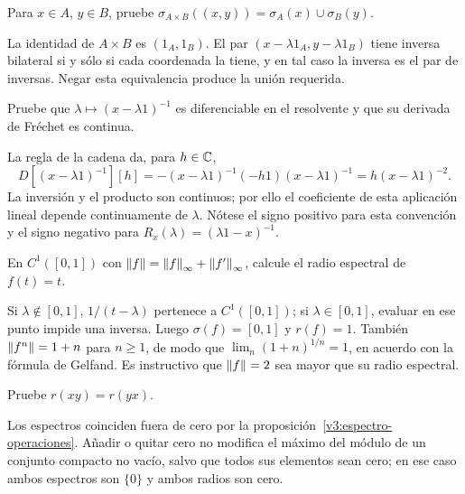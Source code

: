 \begin{ejercicio}\label{ej:v3-l22-2}
Para $x\in A$, $y\in B$, pruebe $\sigma_{A\times B}((x,y))=\sigma_A(x)\cup\sigma_B(y)$.
\end{ejercicio}
\begin{solucion}
La identidad de $A\times B$ es $(1_A,1_B)$. El par $(x-\lambda1_A,y-\lambda1_B)$ tiene inversa bilateral si y sólo si cada coordenada la tiene, y en tal caso la inversa es el par de inversas. Negar esta equivalencia produce la unión requerida.
\end{solucion}

\begin{ejercicio}\label{ej:v3-l22-3}
Pruebe que $\lambda\mapsto(x-\lambda1)^{-1}$ es diferenciable en el resolvente y que su derivada de Fréchet es continua.
\end{ejercicio}
\begin{solucion}
La regla de la cadena da, para $h\in\mathbb C$,
\[
 D[(x-\lambda1)^{-1}][h]
 =-(x-\lambda1)^{-1}(-h1)(x-\lambda1)^{-1}
 =h(x-\lambda1)^{-2}.
\]
La inversión y el producto son continuos; por ello el coeficiente de esta aplicación lineal depende continuamente de $\lambda$. Nótese el signo positivo para esta convención y el signo negativo para $R_x(\lambda)=(\lambda1-x)^{-1}$.
\end{solucion}

\begin{ejercicio}\label{ej:v3-l22-4}
En $C^1([0,1])$ con $\left\lVert f\right\rVert=\left\lVert f\right\rVert_\infty+\left\lVert f'\right\rVert_\infty$, calcule el radio espectral de $f(t)=t$.
\end{ejercicio}
\begin{solucion}
Si $\lambda\notin[0,1]$, $1/(t-\lambda)$ pertenece a $C^1([0,1])$; si $\lambda\in[0,1]$, evaluar en ese punto impide una inversa. Luego $\sigma(f)=[0,1]$ y $r(f)=1$. También $\left\lVert f^n\right\rVert=1+n$ para $n\ge1$, de modo que $\lim_n(1+n)^{1/n}=1$, en acuerdo con la fórmula de Gelfand. Es instructivo que $\left\lVert f\right\rVert=2$ sea mayor que su radio espectral.
\end{solucion}

\begin{ejercicio}\label{ej:v3-l22-5}
Pruebe $r(xy)=r(yx)$.
\end{ejercicio}
\begin{solucion}
Los espectros coinciden fuera de cero por la proposición~\ref{v3:espectro-operaciones}. Añadir o quitar cero no modifica el máximo del módulo de un conjunto compacto no vacío, salvo que todos sus elementos sean cero; en ese caso ambos espectros son $\{0\}$ y ambos radios son cero.
\end{solucion}

